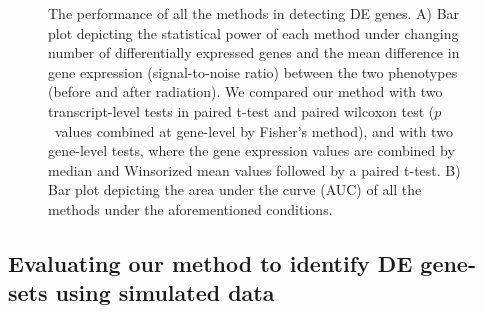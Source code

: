 \documentclass[hidelinks,11pt]{article}
\begin{document}
\begin{figure}[!ht]
\hfill
{}
\hfill
{}
\hfill
\caption{The performance of all the methods in detecting DE genes. A) Bar plot depicting the statistical power of each method under changing number of differentially expressed genes and the mean difference in gene expression (signal-to-noise ratio) between the two phenotypes (before and after radiation). We compared our method with two transcript-level tests in paired t-test and paired wilcoxon test ($p$~values combined at gene-level by Fisher's method), and with two gene-level tests, where the gene expression values are combined by median and Winsorized mean values followed by a paired t-test. B) Bar plot depicting the area under the curve (AUC) of all the methods under the aforementioned conditions.}
\end{figure}

\subsection*{Evaluating our method to identify DE gene-sets using simulated data}
\end{document}
